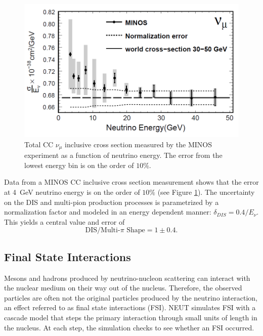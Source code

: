 \begin{figure}
\centering
\includegraphics[width=6in]{Figures/disminos.PNG}
\caption{Total CC $\nu_\mu$ inclusive cross section measured by the MINOS experiment as a function of neutrino energy. The error from the lowest energy bin is on the order of $10\%$.} 
\label{fig:disminos}
\end{figure}

Data from a MINOS CC inclusive cross section measurement\cite{ccminos} shows that the error at 4~GeV neutrino energy is on the order of $10\%$ (see Figure \ref{fig:disminos}). The uncertainty on the DIS and multi-pion production processes is parametrized by a normalization factor and modeled in an energy dependent manner: $\delta_{DIS} = 0.4/E_\nu$. This yields a central value and error of
\begin{equation}
\text{DIS/Multi-}\pi\text{~Shape} = 1 \pm 0.4.
\end{equation}

\subsection{Final State Interactions}

Mesons and hadrons produced by neutrino-nucleon scattering can interact with the nuclear medium on their way out of the nucleus. Therefore, the observed particles are often not the original particles produced by the neutrino interaction, an effect referred to as final state interactions (FSI). NEUT simulates FSI with a cascade model that steps the primary interaction through small units of length in the nucleus. At each step, the simulation checks to see whether an FSI occurred.

